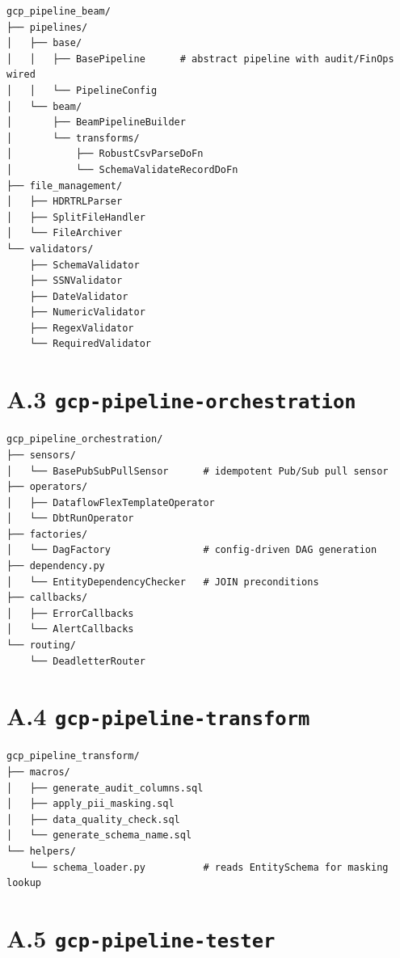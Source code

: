\documentclass[
  11pt,
  british,
  oneside]{book}
\begin{document}
\begin{verbatim}
gcp_pipeline_beam/
├── pipelines/
│   ├── base/
│   │   ├── BasePipeline      # abstract pipeline with audit/FinOps wired
│   │   └── PipelineConfig
│   └── beam/
│       ├── BeamPipelineBuilder
│       └── transforms/
│           ├── RobustCsvParseDoFn
│           └── SchemaValidateRecordDoFn
├── file_management/
│   ├── HDRTRLParser
│   ├── SplitFileHandler
│   └── FileArchiver
└── validators/
    ├── SchemaValidator
    ├── SSNValidator
    ├── DateValidator
    ├── NumericValidator
    ├── RegexValidator
    └── RequiredValidator
\end{verbatim}

\hypertarget{a.3-gcp-pipeline-orchestration}{%
\section{\texorpdfstring{A.3
\texttt{gcp-pipeline-orchestration}}{A.3 gcp-pipeline-orchestration}}\label{a.3-gcp-pipeline-orchestration}}

\begin{verbatim}
gcp_pipeline_orchestration/
├── sensors/
│   └── BasePubSubPullSensor      # idempotent Pub/Sub pull sensor
├── operators/
│   ├── DataflowFlexTemplateOperator
│   └── DbtRunOperator
├── factories/
│   └── DagFactory                # config-driven DAG generation
├── dependency.py
│   └── EntityDependencyChecker   # JOIN preconditions
├── callbacks/
│   ├── ErrorCallbacks
│   └── AlertCallbacks
└── routing/
    └── DeadletterRouter
\end{verbatim}

\hypertarget{a.4-gcp-pipeline-transform}{%
\section{\texorpdfstring{A.4
\texttt{gcp-pipeline-transform}}{A.4 gcp-pipeline-transform}}\label{a.4-gcp-pipeline-transform}}

\begin{verbatim}
gcp_pipeline_transform/
├── macros/
│   ├── generate_audit_columns.sql
│   ├── apply_pii_masking.sql
│   ├── data_quality_check.sql
│   └── generate_schema_name.sql
└── helpers/
    └── schema_loader.py          # reads EntitySchema for masking lookup
\end{verbatim}

\hypertarget{a.5-gcp-pipeline-tester}{%
\section{\texorpdfstring{A.5
\texttt{gcp-pipeline-tester}}{A.5 gcp-pipeline-tester}}\label{a.5-gcp-pipeline-tester}}
\end{document}
